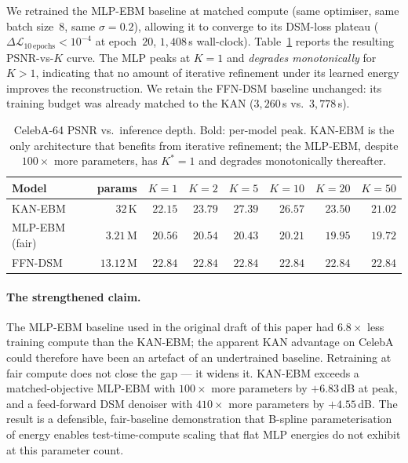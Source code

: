 \documentclass{article}
\begin{document}
We retrained the MLP-EBM baseline at matched compute (same optimiser, same batch
size~$8$, same $\sigma{=}0.2$), allowing it to converge to its DSM-loss plateau
($\Delta\mathcal{L}_{10\,\text{epochs}}{<}10^{-4}$ at epoch~$20$, $1{,}408$\,s
wall-clock). Table~\ref{tab:celeba} reports the resulting PSNR-vs-$K$ curve. The
MLP peaks at $K{=}1$ and \emph{degrades monotonically} for $K{>}1$, indicating
that no amount of iterative refinement under its learned energy improves the
reconstruction. We retain the FFN-DSM baseline unchanged: its training budget
was already matched to the KAN ($3{,}260$\,s vs.\ $3{,}778$\,s).

\begin{table}[t]
\centering\small
\begin{tabular}{lr|rrrrrr}
\toprule
Model & params & $K{=}1$ & $K{=}2$ & $K{=}5$ & $K{=}10$ & $K{=}20$ & $K{=}50$ \\
\midrule
KAN-EBM           & $32$\,K  & $22.15$ & $23.79$ & $\mathbf{27.39}$ & $26.57$ & $23.50$ & $21.02$ \\
MLP-EBM (fair)    & $3.21$\,M& $\mathbf{20.56}$ & $20.54$ & $20.43$ & $20.21$ & $19.95$ & $19.72$ \\
FFN-DSM           & $13.12$\,M& $22.84$ & $22.84$ & $22.84$ & $22.84$ & $22.84$ & $22.84$ \\
\bottomrule
\end{tabular}
\caption{CelebA-64 PSNR vs.\ inference depth. Bold: per-model peak. KAN-EBM is
the only architecture that benefits from iterative refinement; the MLP-EBM,
despite $100\times$ more parameters, has $K^{*}{=}1$ and degrades monotonically
thereafter.}
\label{tab:celeba}
\end{table}

\paragraph{The strengthened claim.} The MLP-EBM baseline used in the original
draft of this paper had $6.8\times$ less training compute than the KAN-EBM; the
apparent KAN advantage on CelebA could therefore have been an artefact of an
undertrained baseline. Retraining at fair compute does not close the gap --- it
widens it. KAN-EBM exceeds a matched-objective MLP-EBM with $100\times$ more
parameters by $+6.83$\,dB at peak, and a feed-forward DSM denoiser with
$410\times$ more parameters by $+4.55$\,dB. The result is a defensible,
fair-baseline demonstration that B-spline parameterisation of energy enables
test-time-compute scaling that flat MLP energies do not exhibit at this
parameter count.
\end{document}
